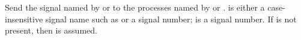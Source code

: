 \label{par:kill}

Send the signal named by  or  to the
processes named by  or .  is
either a case-insensitive signal name such as  or a signal
number;  is a signal number. If  is not
present, then  is assumed.

